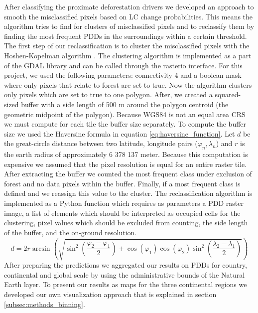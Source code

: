 			After classifying the proximate deforestation drivers we developed an approach to smooth the misclassified pixels based on \ac{LC} change probabilities. This means the algorithm tries to find for clusters of misclassified pixels and to reclassify them by finding the most frequent \acp{PDD} in the surroundings within a certain threshold. The first step of our reclassification is to cluster the misclassified pixels with the Hoshen-Kopelman algorithm \citep{Hoshen1998}. The clustering algorithm is implemented as a part of the \ac{GDAL} library and can be called through the rasterio interface. For this project, we used the following parameters: connectivity 4 and a boolean mask where only pixels that relate to forest are set to true. Now the algorithm clusters only pixels which are set to true to one polygon. After, we created a squared-sized buffer with a side length of 500 m around the polygon centroid (the geometric midpoint of the polygon). Because \ac{WGS84} is not an equal area \ac{CRS} we must compute for each tile the buffer size separately. To compute the buffer size we used the Haversine formula in equation \ref{eq:haversine_function}. Let $d$ be the great-circle distance between two latitude, longitude pairs ($\varphi_n, \lambda_n$) and $r$ is the earth radius of approximately 6 378 137 meter. Because this computation is expensive we assumed that the pixel resolution is equal for an entire raster tile. After extracting the buffer we counted the most frequent class under exclusion of forest and no data pixels within the buffer. Finally, if a most frequent class is defined and we reassign this value to the cluster. The reclassification algorithm is implemented as a Python function which requires as parameters a \ac{PDD} raster image, a list of elements which should be interpreted as occupied cells for the clustering, pixel values which should be excluded from counting, the side length of the buffer, and the on-ground resolution. 
			\begin{equation}
			\label{eq:haversine_function}
				d = 2r\arcsin\left(
				\sqrt{
						\sin^2\left(\frac{\varphi_2-\varphi_1}{2}\right)+\cos\left(\varphi_1\right)\cos\left(\varphi_2\right)\sin^2\left(\frac{\lambda_2-\lambda_1}{2}\right)
				}
				\right)
			\end{equation}
			After preparing the predictions we aggregated our results on \acp{PDD} for country, continental and global scale by using the administrative bounds of the Natural Earth layer. To present our results as maps for the three continental regions we developed our own visualization approach that is explained in section \ref{subsec:methods_binning}.

